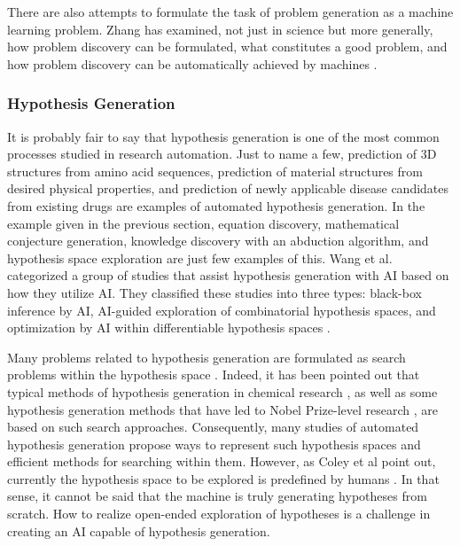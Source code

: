 There are also attempts to formulate the task of problem generation as a machine learning problem. Zhang has examined, not just in science but more generally, how problem discovery can be formulated, what constitutes a good problem, and how problem discovery can be automatically achieved by machines \cite{zhang2021problem}. %







\subsubsection{Hypothesis Generation}
It is probably fair to say that hypothesis generation is one of the most common processes studied in research automation. Just to name a few, prediction of 3D structures from amino acid sequences, prediction of material structures from desired physical properties, and prediction of newly applicable disease candidates from existing drugs are examples of automated hypothesis generation. In the example given in the previous section, equation discovery, mathematical conjecture generation, knowledge discovery with an abduction algorithm, and hypothesis space exploration are just few examples of this. Wang et al. categorized a group of studies that assist hypothesis generation with AI based on how they utilize AI. They classified these studies into three types: black-box inference by AI, AI-guided exploration of combinatorial hypothesis spaces, and optimization by AI within differentiable hypothesis spaces \cite{wang2023scientific}. 

Many problems related to hypothesis generation are formulated as search problems within the hypothesis space \cite{langley1987scientific}. Indeed, it has been pointed out that typical methods of hypothesis generation in chemical research \cite{coley2020autonomous}, as well as some hypothesis generation methods that have led to Nobel Prize-level research \cite{kitano2021nobel}, are based on such search approaches. Consequently, many studies of automated hypothesis generation propose ways to represent such hypothesis spaces and efficient methods for searching within them. However, as Coley et al point out, currently the hypothesis space to be explored is predefined by humans \cite{coley2020autonomousII}. In that sense, it cannot be said that the machine is truly generating hypotheses from scratch. How to realize open-ended exploration of hypotheses is a challenge in creating an AI capable of hypothesis generation.

